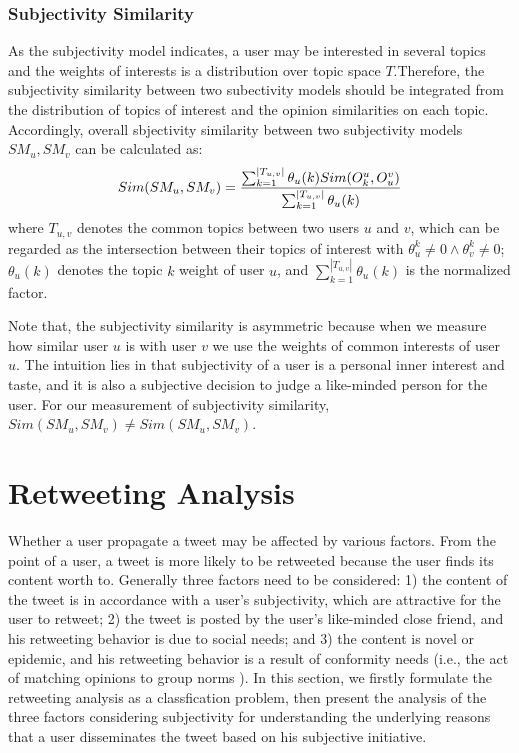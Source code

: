 \documentclass[letterpaper]{article}
\begin{document}
\subsubsection{Subjectivity Similarity}

As the subjectivity model indicates, a user may be interested in several topics and the weights of interests is a distribution over topic space $ T $.Therefore, the subjectivity similarity between two subectivity models should be integrated from the distribution of topics of interest and the opinion similarities on each topic. Accordingly, overall sbjectivity similarity between two subjectivity models $ SM_{u},SM_{v} $ can be calculated as: 
\begin{equation}
\label{subsim}
Sim(SM_{u},SM_{v})=\dfrac{\sum_{k=1}^{|T_{u,v}|}\theta_{u}(k)\* Sim(O_{k}^{u},O_{u}^{v})}{\sum_{k=1}^{|T_{u,v}|}\theta_{u}(k)}
\end{equation}
where $ T_{u,v} $ denotes the common topics between two users $ u $ and $ v $, which can be regarded as the intersection between their topics of interest with $ \theta_u^k\neq 0\wedge \theta_v^k\neq 0$; $ \theta_{u}(k) $ denotes the topic $ k $ weight of user $ u $, and $ \sum_{k=1}^{|T_{u,v}|}\theta_{u}(k) $ is the normalized factor.

Note that, the subjectivity similarity is asymmetric because when we measure how similar user $ u $ is with user $ v $ we use the weights of common interests of user $ u $. The intuition lies in that subjectivity of a user is a personal inner interest and taste, and it is also a subjective decision to judge a like-minded person for the user. For our measurement of subjectivity similarity, $ Sim(SM_u,SM_v)\neq Sim(SM_u,SM_v)$.

\section{Retweeting Analysis}

Whether a user propagate a tweet may be affected by various factors. From the point of a user, a tweet is more likely to be retweeted because the user finds its content worth to. Generally three factors need to be considered: 1) the content of the tweet is in accordance with a user's subjectivity, which are attractive for the user to retweet; 2) the tweet is posted by the user's like-minded close friend, and his retweeting behavior is due to social needs; and 3) the content is novel or epidemic, and his retweeting behavior is a result of conformity needs (i.e., the act of matching opinions to group norms \cite{cialdini2004social}). In this section, we firstly formulate the retweeting analysis as a classfication problem, then present the analysis of the three factors considering subjectivity for understanding the underlying reasons that a user disseminates the tweet based on his subjective initiative. 
\end{document}

